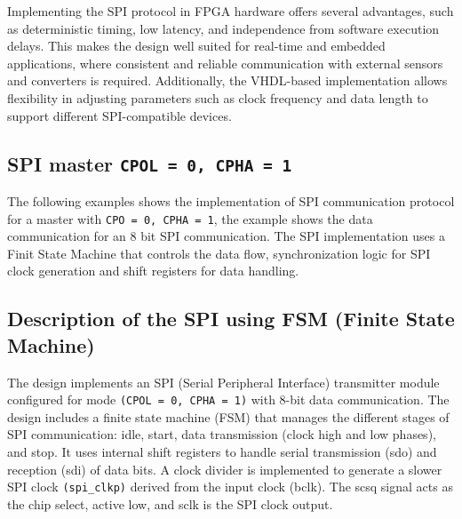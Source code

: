 Implementing the SPI protocol in FPGA hardware offers several advantages, such as deterministic timing, low latency, and independence from software execution delays. This makes the design well suited for real-time and embedded applications, where consistent and reliable communication with external sensors and converters is required. Additionally, the VHDL-based implementation allows flexibility in adjusting parameters such as clock frequency and data length to support different SPI-compatible devices. \cite{mohammadi-spi-vhdl}

\subsection{SPI master \texttt{CPOL = 0, CPHA = 1}}
The following examples shows the implementation of SPI communication protocol for a master with \texttt{CPO = 0, CPHA = 1}, the example shows the data communication for an 8 bit SPI communication. 
The SPI implementation uses a Finit State Machine that controls the data flow, synchronization logic for SPI clock generation and shift registers for data handling. 

\subsection{Description of the SPI using FSM (Finite State Machine)}
The design implements an SPI (Serial Peripheral Interface) transmitter module configured for mode \texttt{(CPOL = 0, CPHA = 1)} with 8-bit data communication. The design includes a finite state machine (FSM) that manages the different stages of SPI communication: idle, start, data transmission (clock high and low phases), and stop. It uses internal shift registers to handle serial transmission (sdo) and reception (sdi) of data bits. A clock divider is implemented to generate a slower SPI clock \texttt{(spi\_clkp)} derived from the input clock (bclk). The scsq signal acts as the
chip select, active low, and sclk is the SPI clock output. 

